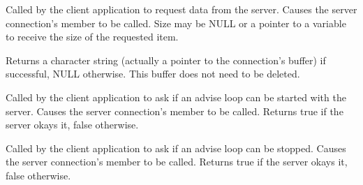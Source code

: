 Called by the client application to request data from the server.
Causes the server connection's  
member to be called. Size may be NULL or a pointer to a variable
to receive the size of the requested item.

Returns a character string (actually a pointer to the
connection's buffer) if successful, NULL otherwise. This buffer
does not need to be deleted.

\label{wxddeconnectionstartadvise}


Called by the client application to ask if an advise loop can be
started with the server. Causes the server connection's 
\rtfsp
member to be called. Returns true if the server okays it, false
otherwise.

\label{wxddeconnectionstopadvise}


Called by the client application to ask if an advise loop can be
stopped. Causes the server connection's  
member to be called. Returns true if the server okays it, false
otherwise.

